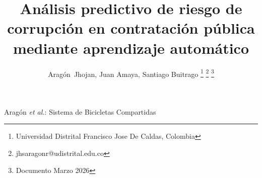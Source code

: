 
\title{Análisis predictivo de riesgo de corrupción en contratación pública mediante aprendizaje automático}

\author{
        Aragón~Jhojan,
        Juan Amaya, 
        Santiago Buitrago%
\thanks{Universidad Distrital Francisco Jose De Caldas, Colombia}%
\thanks{ jhsaragonr@udistrital.edu.co}%
\thanks{Documento Marzo 2026}}

%
{Aragón \MakeLowercase{\textit{et al.}}: Sistema de Bicicletas Compartidas}